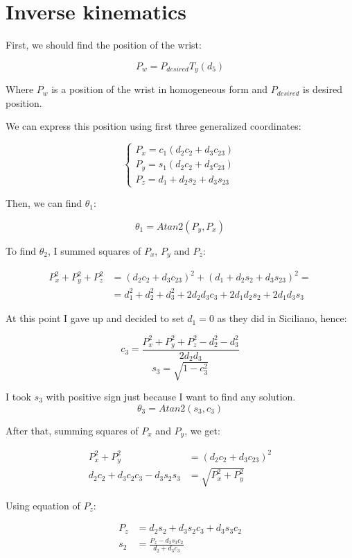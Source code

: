 \section*{Inverse kinematics}

First, we should find the position of the wrist:

$$P_{w} = P_{desired} T_y(d_5)$$

Where $P_{w}$ is a position of the wrist in homogeneous form and $P_{desired}$ is desired position.

We can express this position using first three generalized coordinates:

$$\begin{cases}
    P_x = c_1(d_2 c_2 + d_3 c_{23}) \\
    P_y = s_1(d_2 c_2 + d_3 c_{23}) \\
    P_z = d_1 + d_2 s_2 + d_3 s_{23} 
\end{cases}$$

Then, we can find $\theta_1$:

$$\theta_1 = Atan2(P_y, P_x)$$

To find $\theta_2$, I summed squares of $P_x$, $P_y$ and $P_z$:

$$\begin{aligned}
    P_x^2 + P_y^2 + P_z^2 & = (d_2 c_2 + d_3 c_{23})^2 + (d_1 + d_2 s_2 + d_3 s_{23})^2 = \\
    & = d_1^2 + d_2^2 + d_3^2 + 2d_2d_3c_3 + 2d_1d_2s_2 + 2d_1d_3s_3
\end{aligned}$$

At this point I gave up and decided to set $d_1 = 0$ as they did in Siciliano, hence:

$$c_3 = \frac{P_x^2 + P_y^2 + P_z^2 - d_2^2 - d_3^2}{2d_2d_3}$$
$$s_3 = \sqrt{1 - c_3^2}$$

I took $s_3$ with positive sign just because I want to find any solution.
$$\theta_3 = Atan2(s_3, c_3)$$

After that, summing squares of $P_x$ and $P_y$, we get:

$$\begin{aligned}
    P_x^2 + P_y^2 & = (d_2c_2 + d_3c_{23})^2 \\ 
    d_2c_2 + d_3c_2c_3 - d_3s_2s_3 & = \sqrt{P_x^2 + P_y^2}
\end{aligned}$$

Using equation of $P_z$:

$$\begin{aligned}
    P_z & = d_2s_2 + d_3s_2c_3 + d_3s_3c_2 \\ 
    s_2 & = \frac{P_z - d_3s_3c_2}{d_2 + d_3c_3}
\end{aligned}$$

